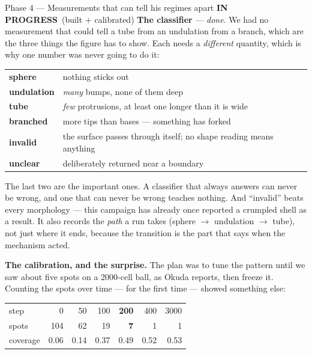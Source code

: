 \documentclass[11pt,a4paper]{article}
\newcommand{\prog}{\textcolor{warn}{\textbf{IN PROGRESS}}}
\begin{document}
\begin{phasebox}{Phase 4 --- Measurements that can tell his regimes apart \hfill \prog\ (built + calibrated)}
\textbf{The classifier} --- \emph{done}. We had no measurement that could tell a tube from an
undulation from a branch, which are the three things the figure has to show. Each needs a
\emph{different} quantity, which is why one number was never going to do it:

\begin{center}\small
\begin{tabular}{@{}ll@{}}
\toprule
\textbf{sphere}     & nothing sticks out\\
\textbf{undulation} & \emph{many} bumps, none of them deep\\
\textbf{tube}       & \emph{few} protrusions, at least one longer than it is wide\\
\textbf{branched}   & more tips than bases --- something has forked\\
\textbf{invalid}    & the surface passes through itself; no shape reading means anything\\
\textbf{unclear}    & deliberately returned near a boundary\\
\bottomrule
\end{tabular}
\end{center}

The last two are the important ones. A classifier that always answers can never be wrong, and one
that can never be wrong teaches nothing. And ``invalid'' beats every morphology --- this campaign
has already once reported a crumpled shell as a result. It also records the \emph{path} a run takes
(sphere $\rightarrow$ undulation $\rightarrow$ tube), not just where it ends, because the transition
is the part that says when the mechanism acted.

\textbf{The calibration, and the surprise.} The plan was to tune the pattern until we saw about five
spots on a 2000-cell ball, as Okuda reports, then freeze it. Counting the spots over time --- for
the first time --- showed something else:

\begin{center}\small
\begin{tabular}{@{}lrrrrrr@{}}
\toprule
step        & 0 & 50 & 100 & \textbf{200} & 400 & 3000\\
spots       & 104 & 62 & 19 & \textbf{7} & 1 & 1\\
coverage    & 0.06 & 0.14 & 0.37 & 0.49 & 0.52 & 0.53\\
\bottomrule
\end{tabular}
\end{center}


\end{phasebox}
\end{document}
